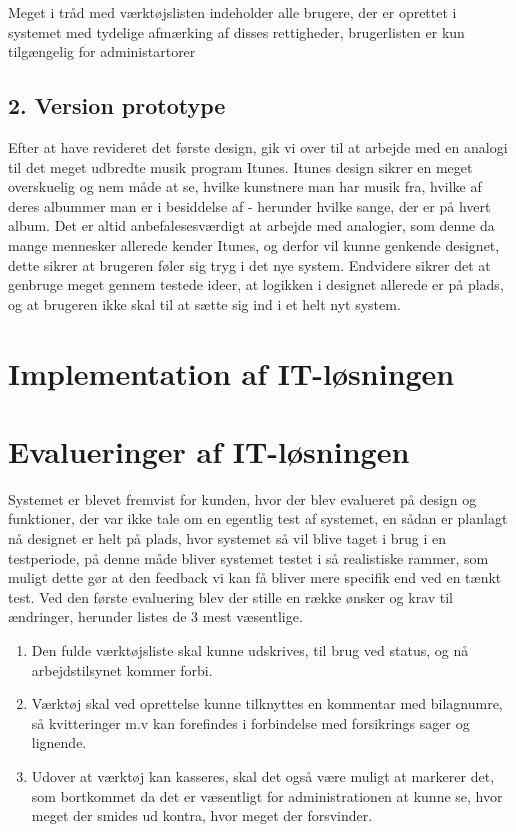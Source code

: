 \documentclass{article}
\begin{document}
Meget i tråd med værktøjslisten indeholder alle brugere, der er oprettet i systemet med tydelige afmærking af disses rettigheder, brugerlisten er kun tilgængelig for administartorer 

	
\subsection{2. Version prototype}
Efter at have revideret det første design, gik vi over til at arbejde med en analogi til det meget udbredte musik program Itunes. Itunes design sikrer en meget overskuelig og nem måde at se, hvilke kunstnere man har musik fra, hvilke af deres albummer man er i besiddelse af - herunder hvilke sange, der er på hvert album. Det er altid anbefalesesværdigt at arbejde med analogier, som denne da mange mennesker allerede kender Itunes, og derfor vil kunne genkende designet, dette sikrer at brugeren føler sig tryg i det nye system. 
Endvidere sikrer det at genbruge meget gennem testede ideer, at logikken i designet allerede er på plads, og at brugeren ikke skal til at sætte sig ind i et helt nyt system.
\section{Implementation af IT-løsningen}

\section{Evalueringer af IT-løsningen}
Systemet er blevet fremvist for kunden, hvor der blev evalueret på design og funktioner, der var ikke tale om en egentlig test af systemet, en sådan er planlagt nå designet er helt på plads, hvor systemet så vil blive taget i brug i en testperiode, på denne måde bliver systemet testet i så realistiske rammer, som muligt dette gør at den feedback vi kan få bliver mere specifik end ved en tænkt test. 
Ved den første evaluering blev der stille en række ønsker og krav til ændringer, herunder listes de 3 mest væsentlige. 
\begin{enumerate}
\item Den fulde værktøjsliste skal kunne udskrives, til brug ved status, og nå arbejdstilsynet kommer forbi. 

\item Værktøj skal ved oprettelse kunne tilknyttes en kommentar med bilagnumre, så kvitteringer m.v kan forefindes i forbindelse med forsikrings sager og lignende. 

\item Udover at værktøj kan kasseres, skal det også være muligt at markerer det, som bortkommet da det er væsentligt for administrationen at kunne se, hvor meget der smides ud kontra, hvor meget der forsvinder.
\end{enumerate}
\end{document}
